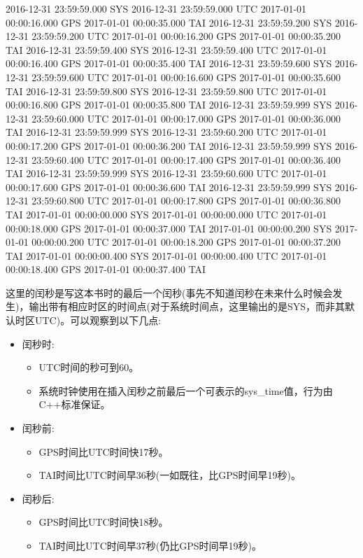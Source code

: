 \begin{shell}
2016-12-31 23:59:59.000 SYS 2016-12-31 23:59:59.000 UTC 2017-01-01 00:00:16.000 GPS 2017-01-01 00:00:35.000 TAI
2016-12-31 23:59:59.200 SYS 2016-12-31 23:59:59.200 UTC 2017-01-01 00:00:16.200 GPS 2017-01-01 00:00:35.200 TAI
2016-12-31 23:59:59.400 SYS 2016-12-31 23:59:59.400 UTC 2017-01-01 00:00:16.400 GPS 2017-01-01 00:00:35.400 TAI
2016-12-31 23:59:59.600 SYS 2016-12-31 23:59:59.600 UTC 2017-01-01 00:00:16.600 GPS 2017-01-01 00:00:35.600 TAI
2016-12-31 23:59:59.800 SYS 2016-12-31 23:59:59.800 UTC 2017-01-01 00:00:16.800 GPS 2017-01-01 00:00:35.800 TAI
2016-12-31 23:59:59.999 SYS 2016-12-31 23:59:60.000 UTC 2017-01-01 00:00:17.000 GPS 2017-01-01 00:00:36.000 TAI
2016-12-31 23:59:59.999 SYS 2016-12-31 23:59:60.200 UTC 2017-01-01 00:00:17.200 GPS 2017-01-01 00:00:36.200 TAI
2016-12-31 23:59:59.999 SYS 2016-12-31 23:59:60.400 UTC 2017-01-01 00:00:17.400 GPS 2017-01-01 00:00:36.400 TAI
2016-12-31 23:59:59.999 SYS 2016-12-31 23:59:60.600 UTC 2017-01-01 00:00:17.600 GPS 2017-01-01 00:00:36.600 TAI
2016-12-31 23:59:59.999 SYS 2016-12-31 23:59:60.800 UTC 2017-01-01 00:00:17.800 GPS 2017-01-01 00:00:36.800 TAI
2017-01-01 00:00:00.000 SYS 2017-01-01 00:00:00.000 UTC 2017-01-01 00:00:18.000 GPS 2017-01-01 00:00:37.000 TAI
2017-01-01 00:00:00.200 SYS 2017-01-01 00:00:00.200 UTC 2017-01-01 00:00:18.200 GPS 2017-01-01 00:00:37.200 TAI
2017-01-01 00:00:00.400 SYS 2017-01-01 00:00:00.400 UTC 2017-01-01 00:00:18.400 GPS 2017-01-01 00:00:37.400 TAI
\end{shell}

这里的闰秒是写这本书时的最后一个闰秒(事先不知道闰秒在未来什么时候会发生)，输出带有相应时区的时间点(对于系统时间点，这里输出的是SYS，而非其默认时区UTC)。可以观察到以下几点:

\begin{itemize}
\item
闰秒时:

\begin{itemize}
\item
UTC时间的秒可到60。

\item
系统时钟使用在插入闰秒之前最后一个可表示的sys\_time值，行为由C++标准保证。
\end{itemize}

\item
闰秒前:

\begin{itemize}
\item
GPS时间比UTC时间快17秒。

\item
TAI时间比UTC时间早36秒(一如既往，比GPS时间早19秒)。
\end{itemize}

\item
闰秒后:

\begin{itemize}
\item
GPS时间比UTC时间快18秒。

\item
TAI时间比UTC时间早37秒(仍比GPS时间早19秒)。
\end{itemize}
\end{itemize}

